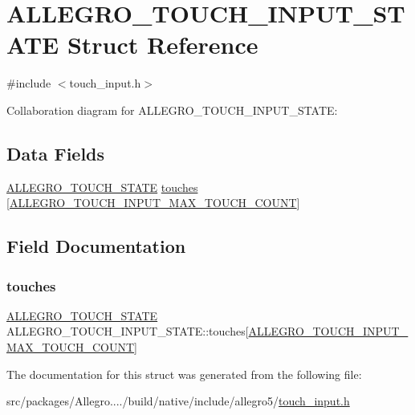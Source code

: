\hypertarget{struct_a_l_l_e_g_r_o___t_o_u_c_h___i_n_p_u_t___s_t_a_t_e}{}\section{A\+L\+L\+E\+G\+R\+O\+\_\+\+T\+O\+U\+C\+H\+\_\+\+I\+N\+P\+U\+T\+\_\+\+S\+T\+A\+TE Struct Reference}
\label{struct_a_l_l_e_g_r_o___t_o_u_c_h___i_n_p_u_t___s_t_a_t_e}


{\ttfamily \#include $<$touch\+\_\+input.\+h$>$}



Collaboration diagram for A\+L\+L\+E\+G\+R\+O\+\_\+\+T\+O\+U\+C\+H\+\_\+\+I\+N\+P\+U\+T\+\_\+\+S\+T\+A\+TE\+:
\subsection*{Data Fields}
\begin{DoxyCompactItemize}
\item 
\hyperlink{struct_a_l_l_e_g_r_o___t_o_u_c_h___s_t_a_t_e}{A\+L\+L\+E\+G\+R\+O\+\_\+\+T\+O\+U\+C\+H\+\_\+\+S\+T\+A\+TE} \hyperlink{struct_a_l_l_e_g_r_o___t_o_u_c_h___i_n_p_u_t___s_t_a_t_e_a3e7bf29d9c28e88a4396b0895e175022}{touches} \mbox{[}\hyperlink{touch__input_8h_a5b728b5a79cbef9e05f1804330032962}{A\+L\+L\+E\+G\+R\+O\+\_\+\+T\+O\+U\+C\+H\+\_\+\+I\+N\+P\+U\+T\+\_\+\+M\+A\+X\+\_\+\+T\+O\+U\+C\+H\+\_\+\+C\+O\+U\+NT}\mbox{]}
\end{DoxyCompactItemize}


\subsection{Field Documentation}
\mbox{\label{struct_a_l_l_e_g_r_o___t_o_u_c_h___i_n_p_u_t___s_t_a_t_e_a3e7bf29d9c28e88a4396b0895e175022}} 
\subsubsection{\texorpdfstring{touches}{touches}}
{\footnotesize\ttfamily \hyperlink{struct_a_l_l_e_g_r_o___t_o_u_c_h___s_t_a_t_e}{A\+L\+L\+E\+G\+R\+O\+\_\+\+T\+O\+U\+C\+H\+\_\+\+S\+T\+A\+TE} A\+L\+L\+E\+G\+R\+O\+\_\+\+T\+O\+U\+C\+H\+\_\+\+I\+N\+P\+U\+T\+\_\+\+S\+T\+A\+T\+E\+::touches\mbox{[}\hyperlink{touch__input_8h_a5b728b5a79cbef9e05f1804330032962}{A\+L\+L\+E\+G\+R\+O\+\_\+\+T\+O\+U\+C\+H\+\_\+\+I\+N\+P\+U\+T\+\_\+\+M\+A\+X\+\_\+\+T\+O\+U\+C\+H\+\_\+\+C\+O\+U\+NT}\mbox{]}}



The documentation for this struct was generated from the following file\+:\begin{DoxyCompactItemize}
\item 
src/packages/\+Allegro..../build/native/include/allegro5/\hyperlink{touch__input_8h}{touch\+\_\+input.\+h}\end{DoxyCompactItemize}
